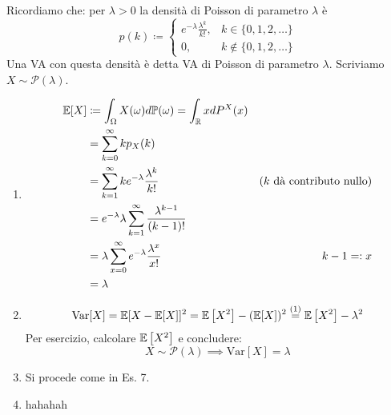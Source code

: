 Ricordiamo che: per $\lambda  >0$ la densità di Poisson di parametro $\lambda $ è
\begin{equation*}
p( k) \coloneqq
\begin{cases}
e^{-\lambda }\frac{\lambda ^{k}}{k!} , & k\in \{0,1,2,\dots \}\\
0, & k\notin \{0,1,2,\dots \}
\end{cases}
\end{equation*}
Una VA con questa densità è detta VA di Poisson di parametro $\lambda $. Scriviamo $X\sim \mathcal{P}( \lambda )$.
\begin{enumerate}
\item
\begin{align*}
\mathbb{E}[ X] & \coloneqq \int _{\Omega } X( \omega ) d\mathbb{P}( \omega ) =\int _{\mathbb{R}} xdP^{X}( x) & \\
 & =\sum\limits _{k=0}^{\infty } kp_{X}( k) & \\
 & =\sum\limits _{k=1}^{\infty } ke^{-\lambda }\frac{\lambda ^{k}}{k!} & \text{(} k\ \text{dà contributo nullo)}\\
 & =e^{-\lambda } \lambda \sum\limits _{k=1}^{\infty }\frac{\lambda ^{k-1}}{( k-1) !} & \\
 & =\lambda \sum\limits _{x=0}^{\infty } e^{-\lambda }\frac{\lambda ^{x}}{x!} & k-1=:x\\
 & =\lambda  & 
\end{align*}
\item
\begin{equation*}
\mathrm{Var}[ X] =\mathbb{E}[ X-\mathbb{E}[ X]]^{2} =\mathbb{E}\left[ X^{2}\right] -(\mathbb{E}[ X])^{2}\overset{( 1)}{=}\mathbb{E}\left[ X^{2}\right] -\lambda ^{2}
\end{equation*}
Per esercizio, calcolare $\mathbb{E}\left[ X^{2}\right]$ e concludere:
\begin{equation*}
X\sim \mathcal{P}( \lambda ) \implies \mathrm{Var}[ X] =\lambda 
\end{equation*}
\item Si procede come in Es. 7.
\item hahahah
\end{enumerate}

\Soluzione


